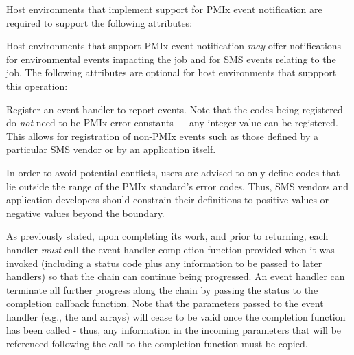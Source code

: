 Host environments that implement support for \ac{PMIx} event notification are required to support the following attributes:


\reqattrend

\optattrstart
Host environments that support \ac{PMIx} event notification \textit{may} offer notifications for environmental events impacting the job and for \ac{SMS} events relating to the job. The following attributes are optional for host environments that suppport this operation:


\optattrend

\descr

Register an event handler to report events. Note that the codes being registered do \textit{not} need to be \ac{PMIx} error constants --- any integer value can be registered. This allows for registration of non-PMIx events such as those defined by a particular \ac{SMS} vendor or by an application itself.

\adviceuserstart
In order to avoid potential conflicts, users are advised to only define codes that lie outside the range of the \ac{PMIx} standard's error codes. Thus, \ac{SMS} vendors and application developers should constrain their definitions to positive values or negative values beyond the  boundary.
\adviceuserend


\adviceuserstart
As previously stated, upon completing its work, and prior to returning, each handler \textit{must} call the event handler completion function provided when it was invoked (including a status code plus any information to be passed to later handlers) so that the chain can continue being progressed. An event handler can terminate all further progress along the chain by passing the  status to the completion callback function. Note that the parameters passed to the event handler (e.g., the  and  arrays) will cease to be valid once the completion function has been called - thus, any information in the incoming parameters that will be referenced following the call to the completion function must be copied.
\adviceuserend

